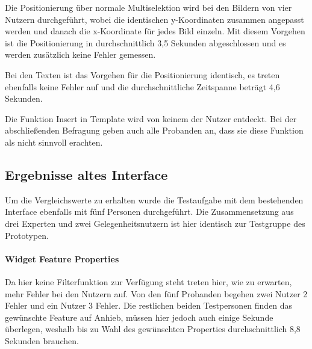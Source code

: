 Die Positionierung über normale Multiselektion wird bei den Bildern von vier Nutzern durchgeführt, wobei die identischen y-Koordinaten zusammen angepasst werden und danach die x-Koordinate für jedes Bild einzeln.
Mit diesem Vorgehen ist die Positionierung in durchschnittlich 3,5 Sekunden abgeschlossen und es werden zusätzlich keine Fehler gemessen.

Bei den Texten ist das Vorgehen für die Positionierung identisch, es treten ebenfalls keine Fehler auf und die durchschnittliche Zeitspanne beträgt 4,6 Sekunden.

Die Funktion \glqq Insert in Template\grqq{} wird von keinem der Nutzer entdeckt. Bei der abschließenden Befragung geben auch alle Probanden an, dass sie diese Funktion als nicht sinnvoll erachten.

\subsection{Ergebnisse altes Interface}
Um die Vergleichswerte zu erhalten wurde die Testaufgabe mit dem bestehenden Interface ebenfalls mit fünf Personen durchgeführt.
Die Zusammensetzung aus drei Experten und zwei Gelegenheitsnutzern ist hier identisch zur Testgruppe des Prototypen.

\paragraph{Widget Feature Properties}
Da hier keine Filterfunktion zur Verfügung steht treten hier, wie zu erwarten, mehr Fehler bei den Nutzern auf.
Von den fünf Probanden begehen zwei Nutzer 2 Fehler und ein Nutzer 3 Fehler.
Die restlichen beiden Testpersonen finden das gewünschte Feature auf Anhieb, müssen hier jedoch auch einige Sekunde überlegen, weshalb bis zu Wahl des gewünschten Properties durchschnittlich 8,8 Sekunden brauchen.

